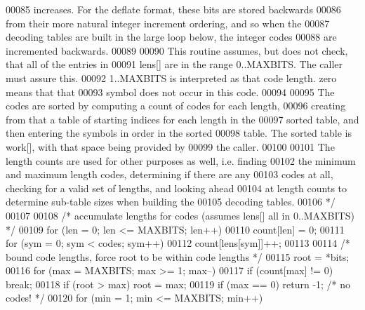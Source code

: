 \begin{DoxyCode}
00085 \textcolor{comment}{       increases.  For the deflate format, these bits are stored backwards}
00086 \textcolor{comment}{       from their more natural integer increment ordering, and so when the}
00087 \textcolor{comment}{       decoding tables are built in the large loop below, the integer codes}
00088 \textcolor{comment}{       are incremented backwards.}
00089 \textcolor{comment}{}
00090 \textcolor{comment}{       This routine assumes, but does not check, that all of the entries in}
00091 \textcolor{comment}{       lens[] are in the range 0..MAXBITS.  The caller must assure this.}
00092 \textcolor{comment}{       1..MAXBITS is interpreted as that code length.  zero means that that}
00093 \textcolor{comment}{       symbol does not occur in this code.}
00094 \textcolor{comment}{}
00095 \textcolor{comment}{       The codes are sorted by computing a count of codes for each length,}
00096 \textcolor{comment}{       creating from that a table of starting indices for each length in the}
00097 \textcolor{comment}{       sorted table, and then entering the symbols in order in the sorted}
00098 \textcolor{comment}{       table.  The sorted table is work[], with that space being provided by}
00099 \textcolor{comment}{       the caller.}
00100 \textcolor{comment}{}
00101 \textcolor{comment}{       The length counts are used for other purposes as well, i.e. finding}
00102 \textcolor{comment}{       the minimum and maximum length codes, determining if there are any}
00103 \textcolor{comment}{       codes at all, checking for a valid set of lengths, and looking ahead}
00104 \textcolor{comment}{       at length counts to determine sub-table sizes when building the}
00105 \textcolor{comment}{       decoding tables.}
00106 \textcolor{comment}{     */}
00107 
00108     \textcolor{comment}{/* accumulate lengths for codes (assumes lens[] all in 0..MAXBITS) */}
00109     \textcolor{keywordflow}{for} (len = 0; len <= MAXBITS; len++)
00110         count[len] = 0;
00111     \textcolor{keywordflow}{for} (sym = 0; sym < codes; sym++)
00112         count[lens[sym]]++;
00113 
00114     \textcolor{comment}{/* bound code lengths, force root to be within code lengths */}
00115     root = *bits;
00116     \textcolor{keywordflow}{for} (max = MAXBITS; max >= 1; max--)
00117         \textcolor{keywordflow}{if} (count[max] != 0) \textcolor{keywordflow}{break};
00118     \textcolor{keywordflow}{if} (root > max) root = max;
00119     \textcolor{keywordflow}{if} (max == 0) \textcolor{keywordflow}{return} -1;            \textcolor{comment}{/* no codes! */}
00120     \textcolor{keywordflow}{for} (min = 1; min <= MAXBITS; min++)

\end{DoxyCode}
